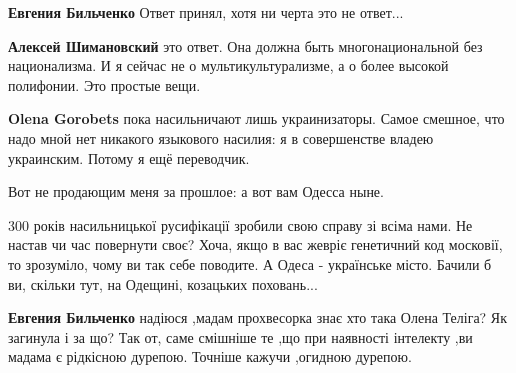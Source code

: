 \begin{itemize}
\begin{itemize}
\textbf{Евгения Бильченко} Ответ принял, хотя ни черта это не ответ...

 
\textbf{Алексей Шимановский} это ответ. Она должна быть многонациональной без
национализма. И я сейчас не о мультикультурализме, а о более высокой полифонии.
Это простые вещи.

 
\textbf{Olena Gorobets} пока насильничают лишь украинизаторы. Самое смешное,
что надо мной нет никакого языкового насилия: я в совершенстве владею
украинским. Потому я ещё переводчик.

 
Вот не продающим меня за прошлое: а вот вам Одесса ныне.

 

300 років насильницької русифікації зробили свою справу зі всіма нами. Не
настав чи час повернути своє? Хоча, якщо в вас жевріє генетичний код московії,
то зрозуміло, чому ви так себе поводите. А Одеса - українське місто. Бачили б
ви, скільки тут, на Одещині, козацьких поховань...


 
\textbf{Евгения Бильченко} надіюся ,мадам прохвесорка знає хто така Олена
Теліга? Як загинула і за що? Так от, саме смішніше те ,що при наявності
інтелекту ,ви мадама є рідкісною дурепою. Точніше кажучи ,огидною дурепою.



\end{itemize}
\end{itemize}
